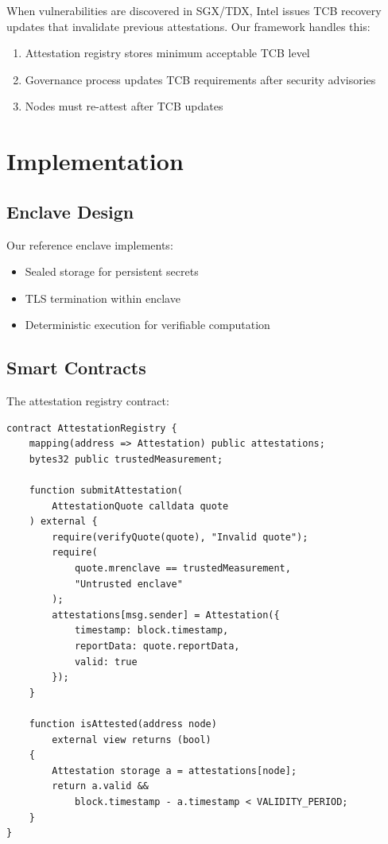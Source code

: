 \documentclass[11pt,a4paper]{article}
\theoremstyle{definition}
\begin{document}
When vulnerabilities are discovered in SGX/TDX, Intel issues TCB recovery updates that invalidate previous attestations. Our framework handles this:

\begin{enumerate}
    \item Attestation registry stores minimum acceptable TCB level
    \item Governance process updates TCB requirements after security advisories
    \item Nodes must re-attest after TCB updates
\end{enumerate}

\section{Implementation}

\subsection{Enclave Design}

Our reference enclave implements:
\begin{itemize}
    \item Sealed storage for persistent secrets
    \item TLS termination within enclave
    \item Deterministic execution for verifiable computation
\end{itemize}

\subsection{Smart Contracts}

The attestation registry contract:

\begin{lstlisting}[language=Solidity,basicstyle=\ttfamily\small]
contract AttestationRegistry {
    mapping(address => Attestation) public attestations;
    bytes32 public trustedMeasurement;

    function submitAttestation(
        AttestationQuote calldata quote
    ) external {
        require(verifyQuote(quote), "Invalid quote");
        require(
            quote.mrenclave == trustedMeasurement,
            "Untrusted enclave"
        );
        attestations[msg.sender] = Attestation({
            timestamp: block.timestamp,
            reportData: quote.reportData,
            valid: true
        });
    }

    function isAttested(address node)
        external view returns (bool)
    {
        Attestation storage a = attestations[node];
        return a.valid &&
            block.timestamp - a.timestamp < VALIDITY_PERIOD;
    }
}
\end{lstlisting}
\end{document}
